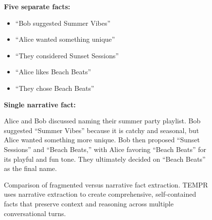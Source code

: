 \begin{figure}[t]
\centering
\begin{tcolorbox}[
    colback=teal!5!white,
    colframe=teal!60!black,
    title=Fragmented Extraction (Avoided),
    fonttitle=\bfseries,
    coltitle=white,
    colbacktitle=teal!60!black,
    boxrule=0.8pt,
    arc=1mm,
    enhanced,
    width=0.95\linewidth
]
\textbf{Five separate facts:}
\begin{itemize}
\item ``Bob suggested Summer Vibes''
\item ``Alice wanted something unique''
\item ``They considered Sunset Sessions''
\item ``Alice likes Beach Beats''
\item ``They chose Beach Beats''
\end{itemize}
\end{tcolorbox}

\vspace{0.3cm}

\begin{tcolorbox}[
    colback=teal!5!white,
    colframe=teal!60!black,
    title=Narrative Extraction (Used),
    fonttitle=\bfseries,
    coltitle=white,
    colbacktitle=teal!60!black,
    boxrule=0.8pt,
    arc=1mm,
    enhanced,
    width=0.95\linewidth
]
\textbf{Single narrative fact:}

Alice and Bob discussed naming their summer party playlist. Bob suggested ``Summer Vibes'' because it is catchy and seasonal, but Alice wanted something more unique. Bob then proposed ``Sunset Sessions'' and ``Beach Beats,'' with Alice favoring ``Beach Beats'' for its playful and fun tone. They ultimately decided on ``Beach Beats'' as the final name.
\end{tcolorbox}

\caption{Comparison of fragmented versus narrative fact extraction. TEMPR uses narrative extraction to create comprehensive, self-contained facts that preserve context and reasoning across multiple conversational turns.}
\label{fig:chunking-strategy}
\end{figure}


